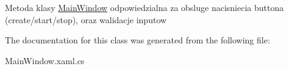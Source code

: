 Metoda klasy \mbox{\hyperlink{class_game_of_life_1_1_main_window}{Main\+Window}} odpowiedzialna za obsluge nacisniecia buttona (create/start/stop), oraz walidacje inputow 



The documentation for this class was generated from the following file\+:\begin{DoxyCompactItemize}
\item 
Main\+Window.\+xaml.\+cs\end{DoxyCompactItemize}
